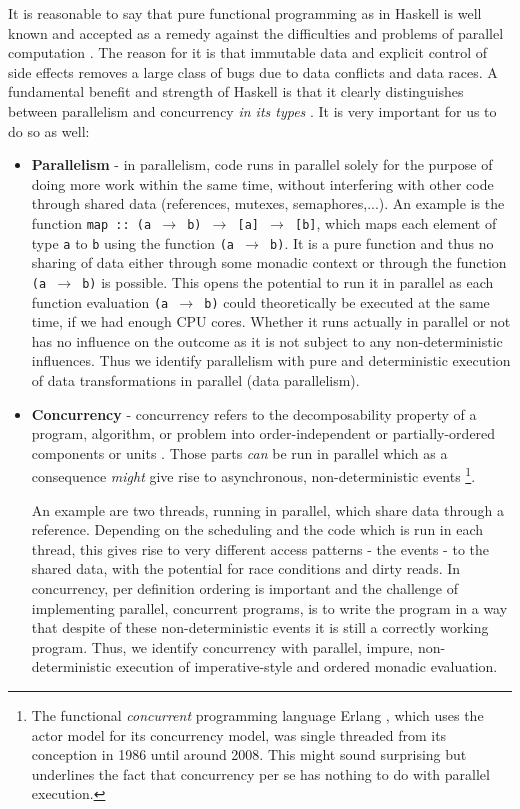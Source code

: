 \medskip

It is reasonable to say that pure functional programming as in Haskell is well known and accepted as a remedy against the difficulties and problems of parallel computation \cite{hudak_history_2007}. The reason for it is that immutable data and explicit control of side effects removes a large class of bugs due to data conflicts and data races. A fundamental benefit and strength of Haskell is that it clearly distinguishes between parallelism and concurrency \textit{in its types} \cite{jones_tackling_2002}. It is very important for us to do so as well:

\begin{itemize}
	\item \textbf{Parallelism} - in parallelism, code runs in parallel solely for the purpose of doing more work within the same time, without interfering with other code through shared data (references, mutexes, semaphores,...). An example is the function \texttt{map :: (a $\rightarrow$ b) $\rightarrow$ [a] $\rightarrow$ [b]}, which maps each element of type \texttt{a} to \texttt{b} using the function \texttt{(a $\rightarrow$ b)}. It is a pure function and thus no sharing of data either through some monadic context or through the function \texttt{(a $\rightarrow$ b)} is possible. This opens the potential to run it in parallel as each function evaluation \texttt{(a $\rightarrow$ b)} could theoretically be executed at the same time, if we had enough CPU cores. Whether it runs actually in parallel or not has no influence on the outcome as it is not subject to any non-deterministic influences. Thus we identify parallelism with pure and deterministic execution of data transformations in parallel (data parallelism).

	\item \textbf{Concurrency} - concurrency refers to the decomposability property of a program, algorithm, or problem into order-independent or partially-ordered components or units \cite{lamport_time_1978}. Those parts \textit{can} be run in parallel which as a consequence \textit{might} give rise to asynchronous, non-deterministic events \footnote{The functional \textit{concurrent} programming language Erlang \cite{armstrong_erlang_2010}, which uses the actor model for its concurrency model, was single threaded from its conception in 1986 until around 2008. This might sound surprising but underlines the fact that concurrency per se has nothing to do with parallel execution.}.

	An example are two threads, running in parallel, which share data through a reference. Depending on the scheduling and the code which is run in each thread, this gives rise to very different access patterns - the events - to the shared data, with the potential for race conditions and dirty reads. In concurrency, per definition ordering is important and the challenge of implementing parallel, concurrent programs, is to write the program in a way that despite of these non-deterministic events it is still a correctly working program. Thus, we identify concurrency with parallel, impure, non-deterministic execution of imperative-style and ordered monadic evaluation.
\end{itemize}

